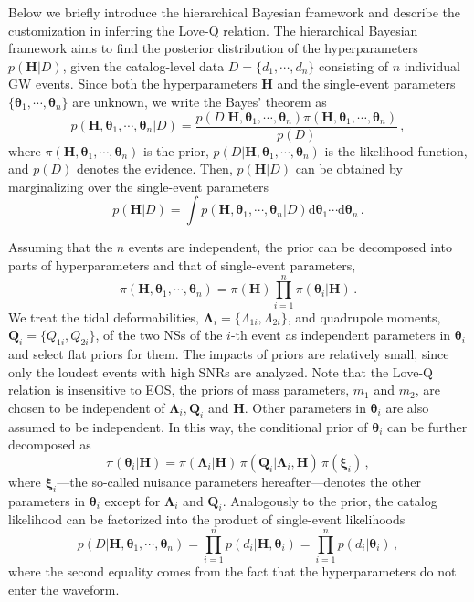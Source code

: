 \documentclass[a4paper,11pt]{article}
\begin{document}
Below we briefly introduce the hierarchical Bayesian framework and describe the
customization in inferring the Love-Q relation.  The hierarchical Bayesian
framework aims to find the posterior distribution of the hyperparameters
$p(\bm{H}|D)$, given the catalog-level data $D=\{d_1,\cdots,d_n\}$ consisting of
$n$ individual GW events.  Since both the hyperparameters $\bm{H}$ and the
single-event parameters $\{\bm{\theta}_1,\cdots,\bm{\theta}_n\}$ are unknown, we
write the Bayes' theorem as 
\begin{equation}
\label{bayes2}
p(\bm{H},\bm{\theta}_1, \cdots,\bm{\theta}_n|D) =\frac{p(D|\bm{H},
\bm{\theta}_1, \cdots,\bm{\theta}_n)\pi(\bm{H}, \bm{\theta}_1,
\cdots,\bm{\theta}_n)}{p(D)}\,,
\end{equation}
where $\pi(\bm{H},\bm{\theta}_1,\cdots,\bm{\theta}_n)$ is the prior,
$p(D|\bm{H},\bm{\theta}_1,\cdots,\bm{\theta}_n)$ is the likelihood function, and
$p(D)$ denotes the evidence. Then, $p(\bm{H}|D)$ can be obtained by 
marginalizing over the single-event parameters
\begin{equation}
\label{bayes1}
p(\bm{H}|D) = \int p(\bm{H},\bm{\theta}_1, \cdots, \bm{\theta}_n|D) \text{d}
\bm{\theta}_1\cdots\text{d} \bm{\theta}_n\,.
\end{equation}

Assuming that the $n$ events are independent, the prior can be decomposed into
parts of hyperparameters and that of single-event parameters,
\begin{equation}
\label{bayes3}
\pi(\bm{H}, \bm{\theta}_1, \cdots,\bm{\theta}_n) = \pi(\bm{H}) \prod_{i=1}^n
\pi(\bm{\theta}_i|\bm{H})\,.
\end{equation}
We treat the tidal deformabilities, $\bm{\Lambda}_i=\{\Lambda_{1i},\Lambda_{2i}\}$, 
and quadrupole moments, $\bm{Q}_i=\{Q_ {1i},Q_{2i}\}$, of the two NSs of the $i\text{-th}$ event 
as independent parameters in $\bm{\theta}_i$ and select flat priors for
them. The impacts of priors are relatively small, since only the loudest events with high SNRs are analyzed. Note that the Love-Q
relation is insensitive to EOS, the priors of mass parameters, $m_1$ and $m_2$,
are chosen to be independent of $\bm{\Lambda}_i, \bm{Q}_i$ and $\bm{H}$. Other
parameters in $\bm{\theta}_i$ are also assumed to be independent.  In this way,
the conditional prior of $\bm{\theta}_i$ can be further decomposed as
\begin{equation}
\label{prior}
\pi(\bm{\theta}_i|\bm{H}) = \pi(\bm{\Lambda}_i|\bm{H}) \,
\pi(\bm{Q}_i|\bm{\Lambda}_i,\bm{H}) \, \pi(\bm{\xi}_i)\,,
\end{equation}
where $\bm{\xi}_i$---the so-called nuisance parameters hereafter---denotes the
other parameters in $\bm{\theta}_i$ except for $\bm{\Lambda}_i$ and $\bm{Q}_i$.
Analogously to the prior, the catalog likelihood can be factorized into the
product of single-event likelihoods
\begin{equation}
    p(D|\bm{H},\bm{\theta}_1, \cdots,\bm{\theta}_n) = \prod_{i=1}^{n}
    p(d_i|\bm{H},\bm{\theta}_i)=\prod_{i=1}^{n}
    p(d_i|\bm{\theta}_i)\,,\label{eq:catalog_likelihood}
\end{equation}
where the second equality comes from the fact that the hyperparameters do not
enter the waveform.
\end{document}
